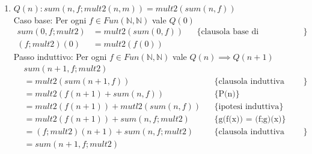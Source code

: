 \documentclass{article}
\begin{document}
\begin{enumerate}
    \item \(Q(n): sum(n, f;mult2(n,m)) = mult2(sum(n,f))\)\\
          Caso base: Per ogni \(f \in Fun(\mathbb{N},\mathbb{N})\) vale \(Q(0)\)
          \begin{align*}
              sum(0,f;mult2) & = mult2(sum(0,f)) &  & \{\text{clausola base di sommatoria}\} \\
              (f;mult2)(0)   & = mult2(f(0))
          \end{align*}
          Passo induttivo: Per ogni \(f \in Fun(\mathbb{N},\mathbb{N})\) vale \(Q(n) \implies Q(n + 1)\)
          \begin{align*}
               & sum(n + 1,f;mult2)                                                        \\
               & = mult2(sum(n + 1, f))             &  & \{\text{clausola induttiva sommatoria}\} \\
               & = mult2(f(n+1) + sum(n,f))         &  & \{\text{P(n)}\}                          \\
               & = mult2(f(n+1)) + mutl2(sum(n,f))  &  & \{\text{ipotesi induttiva}\}             \\
               & = mult2(f(n+1)) + sum(n, f;mult2)  &  & \{\text{g(f(x)) = (f;g)(x)}\}            \\
               & = (f;mult2)(n+1) + sum(n, f;mult2) &  & \{\text{clausola induttiva sommatoria}\} \\
               & = sum(n + 1, f;mult2)
          \end{align*}
\end{enumerate}
\end{document}
